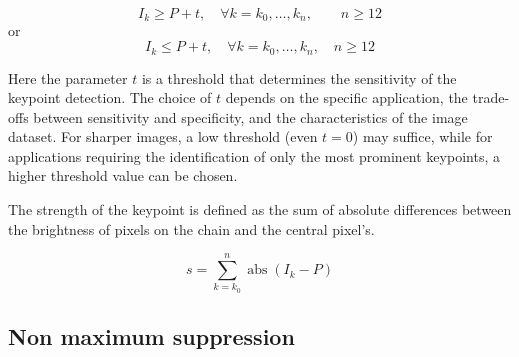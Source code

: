 \documentclass[11pt]{book}
\begin{document}
 \begin{equation}
  I_k \geq P + t,\quad  \forall k = k_0,\ldots, k_n, \qquad n\geq 12
 \end{equation}
 or
 \begin{equation}
  I_k \leq P + t,\quad  \forall k = k_0,\ldots, k_n, \quad n\geq 12
 \end{equation}
 
 
 Here the parameter $t$ is a threshold that determines the sensitivity of the keypoint detection. The choice of $t$ depends on the specific application, the trade-offs between sensitivity and specificity, and the characteristics of the image dataset. For sharper images, a low threshold (even $t=0$) may suffice, while for applications requiring the identification of only the most prominent keypoints, a higher threshold value can be chosen. 
 
 
 The strength of the keypoint is defined as the sum of absolute differences between the  brightness of pixels on the chain and the central pixel's.
 
 \begin{equation}
  s = \sum\limits_{k=k_0}^{n} \operatorname{abs}\left(I_k - P\right)
 \end{equation}
 
 
 
 \subsection{Non maximum suppression}
 
 

 
\backmatter
\end{document}

